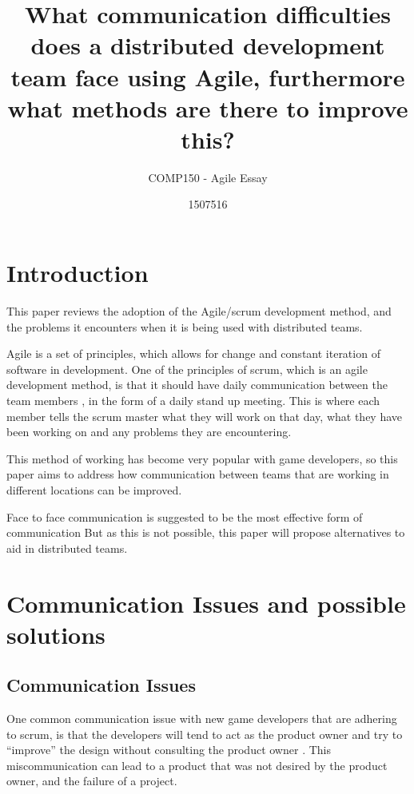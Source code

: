 \documentclass{scrartcl}
\title{What communication difficulties does a distributed development team face using Agile, furthermore what methods are there to improve this?}
\subtitle{COMP150 - Agile Essay}
\author{1507516}
\begin{document}
\maketitle


\section{Introduction}

This paper reviews the adoption of the Agile/scrum development method, and the problems it encounters when it is being used with distributed teams.

Agile is a set of principles, which allows for change and constant iteration of software in development. One of the principles of scrum, which is an agile development method, is that it should have daily communication between the team members \cite{abdullah2011}, in the form of a daily stand up meeting. This is where each member tells the scrum master what they will work on that day, what they have been working on and any problems they are encountering. 

This method of working has become very popular with game developers, so this paper aims to address how communication between teams that are working in different locations can be improved. 

Face to face communication is suggested to be the most effective form of communication \cite{joshi2013} But as this is not possible, this paper will propose alternatives to aid in distributed teams.

\section{Communication Issues and possible solutions}

\subsection{Communication Issues}

One common communication issue with new game developers that are adhering to scrum, is that the developers will tend to act as the product owner and try to ``improve'' the design without consulting the product owner \cite{krasteva2008}. This miscommunication can lead to a product that was not desired by the product owner, and the failure of a project. \par
\end{document}

